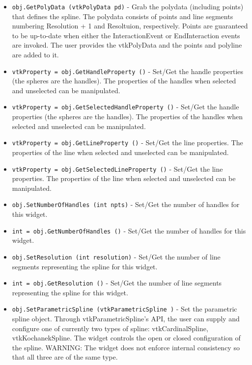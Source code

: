 \begin{itemize}
\item  \verb|obj.GetPolyData (vtkPolyData pd)| -  Grab the polydata (including points) that defines the spline.  The
 polydata consists of points and line segments numbering Resolution + 1
 and Resoltuion, respectively. Points are guaranteed to be up-to-date when
 either the InteractionEvent or  EndInteraction events are invoked. The
 user provides the vtkPolyData and the points and polyline are added to it.

\item  \verb|vtkProperty = obj.GetHandleProperty ()| -  Set/Get the handle properties (the spheres are the handles). The
 properties of the handles when selected and unselected can be manipulated.

\item  \verb|vtkProperty = obj.GetSelectedHandleProperty ()| -  Set/Get the handle properties (the spheres are the handles). The
 properties of the handles when selected and unselected can be manipulated.

\item  \verb|vtkProperty = obj.GetLineProperty ()| -  Set/Get the line properties. The properties of the line when selected
 and unselected can be manipulated.

\item  \verb|vtkProperty = obj.GetSelectedLineProperty ()| -  Set/Get the line properties. The properties of the line when selected
 and unselected can be manipulated.

\item  \verb|obj.SetNumberOfHandles (int npts)| -  Set/Get the number of handles for this widget.

\item  \verb|int = obj.GetNumberOfHandles ()| -  Set/Get the number of handles for this widget.

\item  \verb|obj.SetResolution (int resolution)| -  Set/Get the number of line segments representing the spline for
 this widget.

\item  \verb|int = obj.GetResolution ()| -  Set/Get the number of line segments representing the spline for
 this widget.

\item  \verb|obj.SetParametricSpline (vtkParametricSpline )| -  Set the parametric spline object. Through vtkParametricSpline's API, the
 user can supply and configure one of currently two types of spline:
 vtkCardinalSpline, vtkKochanekSpline. The widget controls the open
 or closed configuration of the spline.
 WARNING: The widget does not enforce internal consistency so that all
 three are of the same type.


\end{itemize}
